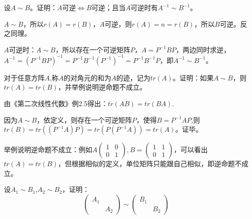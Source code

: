 \documentclass[a4paper]{report}
\begin{document}
\EX 设$A\sim B$。证明：$A$可逆$\Leftrightarrow B$可逆；且当$A$可逆时有$A^{-1}\sim B^{-1}$。

\begin{zhengming}
$A\sim B$，所以$r(A)=r(B)$，$A$可逆，则$r(A)=n=r(B)$，所以$B$可逆。反之同理。

$A$可逆时：$A\sim B$，所以存在一个可逆矩阵$P$，$A=P^{-1}BP$，两边同时求逆，$A^{-1}=(P^{-1}BP)^{-1}=P^{-1}B^{-1}(P^{-1})^{-1}=P^{-1}B^{-1}P$，即$A^{-1}\sim B^{-1}$。
\end{zhengming}

\EX 对于任意方阵$A$,称$A$的对角元的和为$A$的迹，记为$tr(A)$。证明：如果$A\sim B$，则$tr(A)=tr(B)$，并举例说明逆命题不成立。

\begin{zhengming}
由《第二次线性代数》例2.5得出：$tr(AB)=tr(BA)$.

因为$A\sim B$，依定义，则存在一个可逆矩阵$P$，使得$B=P^{-1}AP$,则$tr(B)=tr((P^{-1}A)P)=tr(P(P^{-1}A))=tr(A)$。证毕。

举例说明逆命题不成立：例如$A
\begin{pmatrix}
1&0\\0&1
\end{pmatrix},B=
\begin{pmatrix}
1&1\\
0&1
\end{pmatrix}
$，可以看出$tr(A)=tr(B)$，但根据相似的定义，单位矩阵只能跟自己相似，即逆命题不成立。
\end{zhengming}

\EX 设$A_1\sim B_1$,$A_2\sim B_2$，证明：
\begin{equation*}
\begin{pmatrix}
A_1\\
&A_2
\end{pmatrix}\sim \begin{pmatrix}
B_1\\
&B_2
\end{pmatrix}
\end{equation*}
\end{document}
